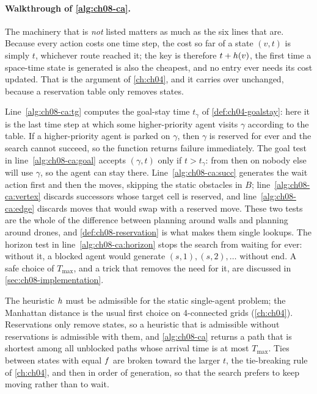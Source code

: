 \paragraph{Walkthrough of \cref{alg:ch08-ca}.} The machinery that is \emph{not} listed
matters as much as the six lines that are. Because every action costs one time step, the
cost so far of a state $(v, t)$ is simply $t$, whichever route reached it; the key is
therefore $t + h(v)$, the first time a space-time state is generated is also the
cheapest, and no entry ever needs its cost updated. That is the argument of
\cref{ch:ch04}, and it carries over unchanged, because a reservation table only removes
states.

Line~\ref{alg:ch08-ca:tg} computes the goal-stay time $t_\gamma$ of
\cref{def:ch04-goalstay}: here it is the last time step at which
some higher-priority agent visits $\gamma$ according to the table. If a
higher-priority agent is parked on $\gamma$, then $\gamma$ is reserved for ever and the
search cannot succeed, so the function returns failure immediately. The goal test in
line~\ref{alg:ch08-ca:goal} accepts $(\gamma, t)$ only if $t > t_\gamma$: from then on
nobody else will use $\gamma$, so the agent can stay there.
Line~\ref{alg:ch08-ca:succ} generates the wait action first and then the moves, skipping
the static obstacles in $B$; line~\ref{alg:ch08-ca:vertex} discards successors whose
target cell is reserved, and line~\ref{alg:ch08-ca:edge} discards moves that would swap
with a reserved move. These two tests are the whole of the difference between planning
around walls and planning around drones, and \cref{def:ch08-reservation} is what makes
them single lookups. The horizon test in line~\ref{alg:ch08-ca:horizon} stops the search
from waiting for ever: without it, a blocked agent would generate
$(s, 1), (s, 2), \dots$ without end. A safe choice of $T_{\max}$, and a trick that
removes the need for it, are discussed in \cref{sec:ch08-implementation}.

The heuristic $h$ must be admissible for the static single-agent problem; the
Manhattan distance is the usual first choice on 4-connected grids
(\cref{ch:ch04}). Reservations only remove states, so a heuristic that is admissible
without reservations is admissible with them, and \cref{alg:ch08-ca} returns a path
that is shortest among all unblocked paths whose arrival time is at most $T_{\max}$.
Ties between states with equal $f$ are broken toward the larger $t$, the
tie-breaking rule of \cref{ch:ch04}, and then in order of generation, so that the
search prefers to keep moving rather than to wait.

